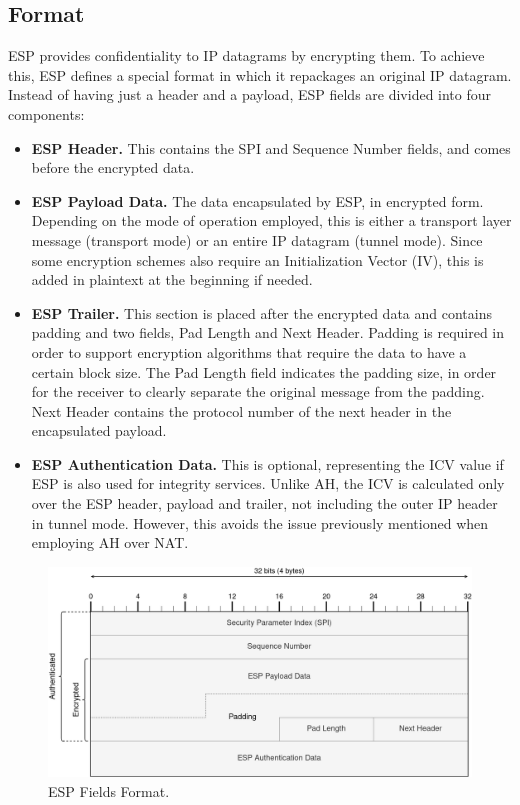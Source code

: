 \documentclass[a4paper,12pt]{report}
\begin{document}
		\subsection{Format}
		ESP provides confidentiality to IP datagrams by encrypting them. To achieve this, ESP defines a special format in which it repackages an original IP datagram. Instead of having just a header and a payload, ESP fields are divided into four components:
		\begin{itemize}
			\item \textbf{ESP Header.} This contains the SPI and Sequence Number fields, and comes before the encrypted data.
			\item \textbf{ESP Payload Data.} The data encapsulated by ESP, in encrypted form. Depending on the mode of operation employed, this is either a transport layer message (transport mode) or an entire IP datagram (tunnel mode). Since some encryption schemes also require an Initialization Vector (IV), this is added in plaintext at the beginning if needed.
			\item \textbf{ESP Trailer.} This section is placed after the encrypted data and contains padding and two fields, Pad Length and Next Header. Padding is required in order to support encryption algorithms that require the data to have a certain block size. The Pad Length field indicates the padding size, in order for the receiver to clearly separate the original message from the padding. Next Header contains the protocol number of the next header in the encapsulated payload.
			\item \textbf{ESP Authentication Data.} This is optional, representing the ICV value if ESP is also used for integrity services. Unlike AH, the ICV is calculated only over the ESP header, payload and trailer, not including the outer IP header in tunnel mode. However, this avoids the issue previously mentioned when employing AH over NAT.
		\end{itemize}
		
		\begin{figure}[h]
			\includegraphics[width=\textwidth]{esp_format}
			\centering
			\caption{ESP Fields Format.}
		\end{figure}
		
\end{document}
